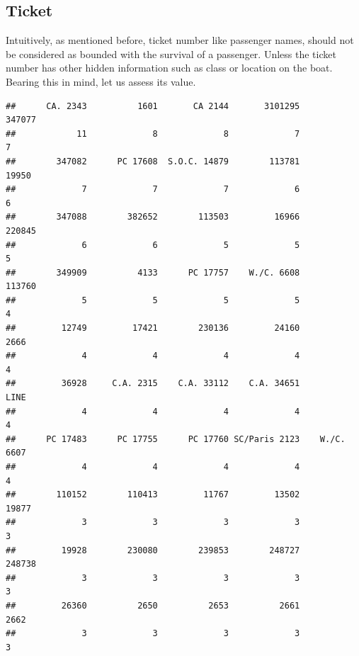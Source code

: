 \documentclass[
]{book}
\newenvironment{Shaded}{\begin{snugshade}}{\end{snugshade}}
\newcommand{\DecValTok}[1]{\textcolor[rgb]{0.00,0.00,0.81}{#1}}
\newcommand{\KeywordTok}[1]{\textcolor[rgb]{0.13,0.29,0.53}{\textbf{#1}}}
\newcommand{\NormalTok}[1]{#1}
\newcommand{\OperatorTok}[1]{\textcolor[rgb]{0.81,0.36,0.00}{\textbf{#1}}}
\begin{document}
\hypertarget{ticket}{%
\subsection{Ticket}\label{ticket}}

Intuitively, as mentioned before, ticket number like passenger names, should not be considered as bounded with the survival of a passenger. Unless the ticket number has other hidden information such as class or location on the boat. Bearing this in mind, let us assess its value.

\begin{Shaded}
\end{Shaded}

\begin{verbatim}
##      CA. 2343          1601       CA 2144       3101295        347077 
##            11             8             8             7             7 
##        347082      PC 17608  S.O.C. 14879        113781         19950 
##             7             7             7             6             6 
##        347088        382652        113503         16966        220845 
##             6             6             5             5             5 
##        349909          4133      PC 17757    W./C. 6608        113760 
##             5             5             5             5             4 
##         12749         17421        230136         24160          2666 
##             4             4             4             4             4 
##         36928     C.A. 2315    C.A. 33112    C.A. 34651          LINE 
##             4             4             4             4             4 
##      PC 17483      PC 17755      PC 17760 SC/Paris 2123    W./C. 6607 
##             4             4             4             4             4 
##        110152        110413         11767         13502         19877 
##             3             3             3             3             3 
##         19928        230080        239853        248727        248738 
##             3             3             3             3             3 
##         26360          2650          2653          2661          2662 
##             3             3             3             3             3
\end{verbatim}
\end{document}
